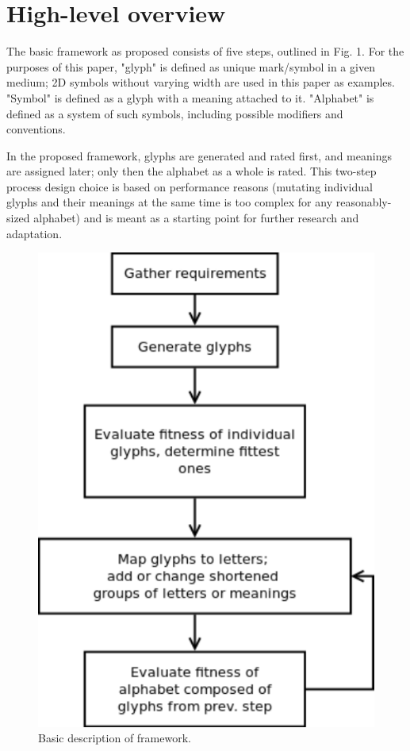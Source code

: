 \documentclass{vgtc}                          %
\begin{document}
\section{High-level overview}

The basic framework as proposed consists of five steps, outlined in Fig. 1. For the purposes of this paper, "glyph" is defined as unique mark/symbol in a given medium; 2D symbols without varying width are used in this paper as examples. "Symbol" is defined as a glyph with a meaning attached to it. "Alphabet" is defined as a system of such symbols, including possible modifiers and conventions.

In the proposed framework, glyphs are generated and rated first, and meanings are assigned later; only then the alphabet as a whole is rated. This two-step process design choice is based on performance reasons (mutating individual glyphs and their meanings at the same time is too complex for any reasonably-sized alphabet) and is meant as a starting point for further research and adaptation. 

\begin{figure}[tb]
\centering
        \includegraphics[width=0.75\hsize]{f.pdf}
\caption{Basic description of framework.}
\end{figure}
\end{document}

